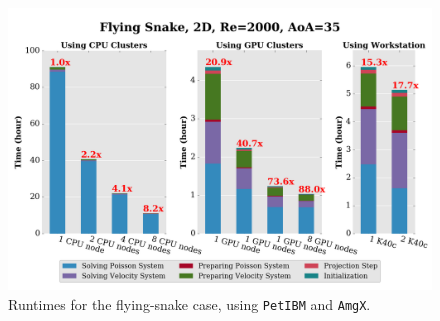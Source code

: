 \documentclass[preprint, 1p]{elsarticle}
\begin{document}
\begin{figure}[h!]
\centering
\includegraphics[width=12cm]{images/flying_snake_performances.png}
\caption{Runtimes for the flying-snake case, using \texttt{PetIBM} and \texttt{AmgX}.}
\label{flying_snake_performances}
\end{figure}



\end{document}
